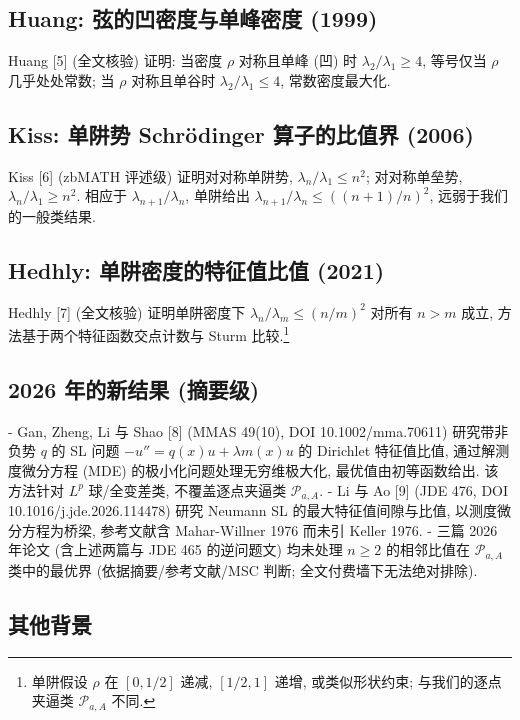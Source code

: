 \documentclass[UTF8]{ctexart}
\begin{document}
\subsection{Huang: 弦的凹密度与单峰密度 (1999)}

Huang [5] (全文核验) 证明: 当密度 $\rho$ 对称且单峰 (凹) 时 $\lambda_2/\lambda_1 \geq 4$, 等号仅当 $\rho$ 几乎处处常数; 当 $\rho$ 对称且单谷时 $\lambda_2/\lambda_1 \leq 4$, 常数密度最大化.

\subsection{Kiss: 单阱势 Schr\"odinger 算子的比值界 (2006)}

Kiss [6] (zbMATH 评述级) 证明对对称单阱势, $\lambda_n/\lambda_1 \leq n^2$; 对对称单垒势, $\lambda_n/\lambda_1 \geq n^2$. 相应于 $\lambda_{n+1}/\lambda_n$, 单阱给出 $\lambda_{n+1}/\lambda_n \leq ((n+1)/n)^2$, 远弱于我们的一般类结果.

\subsection{Hedhly: 单阱密度的特征值比值 (2021)}

Hedhly [7] (全文核验) 证明单阱密度下 $\lambda_n/\lambda_m \leq (n/m)^2$ 对所有 $n > m$ 成立, 方法基于两个特征函数交点计数与 Sturm 比较.\footnote{单阱假设 $\rho$ 在 $[0,1/2]$ 递减, $[1/2,1]$ 递增, 或类似形状约束; 与我们的逐点夹逼类 $\mathcal{P}_{a,A}$ 不同.}

\subsection{2026 年的新结果 (摘要级)}

- Gan, Zheng, Li 与 Shao [8] (MMAS 49(10), DOI 10.1002/mma.70611) 研究带非负势 $q$ 的 SL 问题 $-u'' = q(x)u + \lambda m(x)u$ 的 Dirichlet 特征值比值, 通过解测度微分方程 (MDE) 的极小化问题处理无穷维极大化, 最优值由初等函数给出. 该方法针对 $L^p$ 球/全变差类, 不覆盖逐点夹逼类 $\mathcal{P}_{a,A}$.
- Li 与 Ao [9] (JDE 476, DOI 10.1016/j.jde.2026.114478) 研究 Neumann SL 的最大特征值间隙与比值, 以测度微分方程为桥梁, 参考文献含 Mahar-Willner 1976 而未引 Keller 1976.
- 三篇 2026 年论文 (含上述两篇与 JDE 465 的逆问题文) 均未处理 $n \geq 2$ 的相邻比值在 $\mathcal{P}_{a,A}$ 类中的最优界 (依据摘要/参考文献/MSC 判断; 全文付费墙下无法绝对排除).

\subsection{其他背景}
\end{document}

